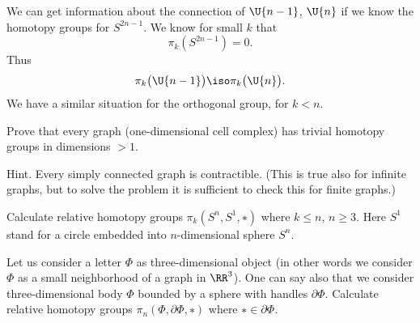 We can get information about the connection of $\U{n-1}$, $\U{n}$
if we know the homotopy groups for $S^{2n-1}$. We know for small
$k$ that
\begin{equation}
\pi_{k}(S^{2n-1})=0.
\end{equation}
Thus 
\begin{equation}
\pi_{k}\bigl(\U{n-1}\bigr)\iso\pi_{k}\bigl(\U{n}\bigr).
\end{equation}
We have a similar situation for the orthogonal group, for $k<n$.

\exercises
\begin{xca}
Prove that every graph (one-dimensional cell complex) has trivial
homotopy groups in dimensions $>1$. 

Hint. Every simply connected graph is contractible. (This is true
also for infinite graphs, but to solve the problem it is
sufficient to check this for finite graphs.)
\end{xca}
\begin{xca}
Calculate relative homotopy groups $\pi_{k}(S^n, S^1, ∗)$ where
$k\leq n$, $n\geq3$. Here $S^1$ stand for a circle embedded into
$n$-dimensional sphere $S^n$. 
\end{xca}
\begin{xca}
Let us consider a letter $\Phi$ as three-dimensional object (in
other words we consider $\Phi$ as a small neighborhood of a graph
in $\RR^3$). One can say also that we consider three-dimensional
body $\Phi$ bounded by a sphere with handles
$\partial\Phi$. Calculate relative homotopy groups 
$\pi_{n}(\Phi, \partial\Phi, ∗)$ where $∗\in\partial\Phi$.
\end{xca}
